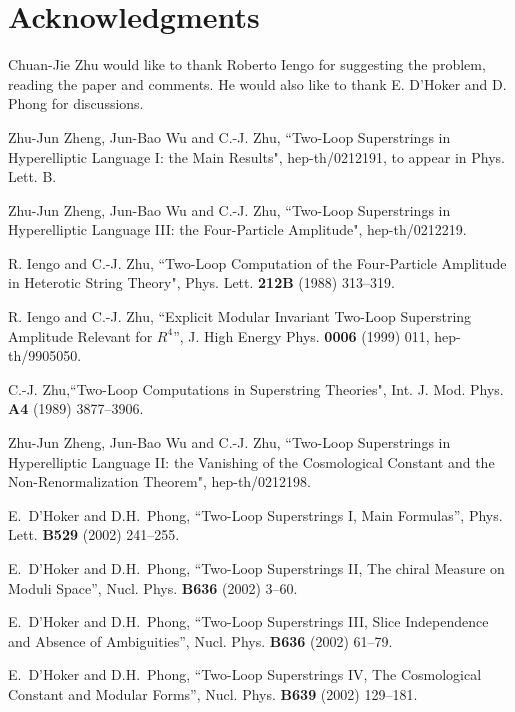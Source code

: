 \documentclass[a4paper,12pt]{article}
\begin{document}
\section*{Acknowledgments}

Chuan-Jie Zhu would like to thank Roberto Iengo for suggesting the
problem, reading the paper and comments. He would also like to
thank E. D'Hoker and D. Phong for discussions.

\begin{thebibliography}{[20]}

 Zhu-Jun Zheng, Jun-Bao Wu and  C.-J. Zhu,
``Two-Loop Superstrings in Hyperelliptic Language I: the Main
Results", hep-th/0212191, to appear in Phys. Lett. B.

 Zhu-Jun Zheng, Jun-Bao Wu and  C.-J. Zhu,
``Two-Loop Superstrings in Hyperelliptic Language III: the
Four-Particle Amplitude", hep-th/0212219.

 R. Iengo and C.-J. Zhu, ``Two-Loop Computation of
the Four-Particle Amplitude in Heterotic String Theory", Phys.
Lett. {\bf  212B} (1988) 313--319.

 R. Iengo and C.-J. Zhu, ``Explicit Modular
Invariant Two-Loop Superstring Amplitude Relevant for $R^4$'', J.
High Energy Phys. {\bf 0006} (1999) 011, hep-th/9905050.

 C.-J. Zhu,``Two-Loop Computations in
Superstring Theories", Int. J. Mod. Phys. {\bf A4} (1989)
3877--3906.

 Zhu-Jun Zheng, Jun-Bao Wu and  C.-J. Zhu,
``Two-Loop Superstrings in Hyperelliptic Language II: the
Vanishing of the Cosmological Constant and the Non-Renormalization
Theorem", hep-th/0212198.

 E.~D'Hoker and D.H.~Phong, ``Two-Loop
Superstrings I, Main Formulas'', Phys. Lett. {\bf B529} (2002)
241--255.

 E.~D'Hoker and D.H.~Phong, ``Two-Loop
Superstrings II, The chiral Measure on Moduli Space'', Nucl. Phys.
{\bf B636} (2002) 3--60.

 E.~D'Hoker and D.H.~Phong, ``Two-Loop
Superstrings III, Slice Independence and Absence of Ambiguities'',
Nucl. Phys. {\bf B636} (2002) 61--79.

 E.~D'Hoker and D.H.~Phong, ``Two-Loop
Superstrings IV, The Cosmological Constant and Modular Forms'',
Nucl. Phys. {\bf B639} (2002) 129--181.


\end{thebibliography}
\end{document}
